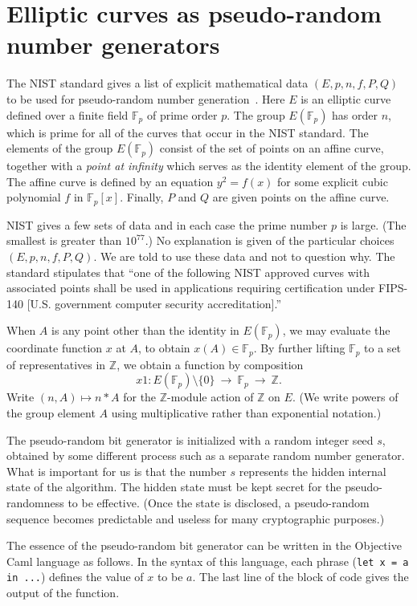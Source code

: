 \documentclass[11pt]{amsart} %
\newcommand{\ring}[1]{\mathbb{#1}}
\begin{document}
\section{Elliptic curves as pseudo-random number generators}

The NIST standard gives a list of explicit mathematical data $(E,p,n,f,P,Q)$ to be used for 
pseudo-random number generation~\cite{NIST}.
Here $E$ is an elliptic curve defined over a finite field $\ring{F}_p$ of prime order $p$.  
The group $E(\ring{F}_p)$ has order $n$, which is prime for all of the curves that occur in the NIST standard.
The elements of the group $E(\ring{F}_p)$ consist of the set of points on an affine curve, 
together with a {\it point at infinity} which
serves as the identity element of the group.
The affine curve is defined by an equation $y^2 = f(x)$
for some explicit cubic polynomial $f$ in $\ring{F}_p[x]$.
Finally, $P$ and $Q$ are given points on the affine curve. 

NIST gives a few sets of  data and in each case the  prime number $p$ is large. (The smallest is greater than $10^{77}$.)
No explanation is given of the particular choices $(E,p,n,f,P,Q)$.  We are told to
use these data and not to question why.
The standard stipulates that ``one of the following NIST approved curves with associated points 
shall be used in applications requiring certification under FIPS-140 [U.S. government computer security accreditation].'' 

When $A$ is any point other than the identity in $E(\ring{F}_p)$,
we may evaluate the coordinate function $x$ at $A$, to obtain $x(A)\in \ring{F}_p$.  By further lifting
$\ring{F}_p$ to a set of representatives in $\ring{Z}$, we obtain a function
by composition
\[
x1 : E(\ring{F}_p)\setminus\{0\}~ \to~ \ring{F}_p~\to~ \ring{Z}.
\]
Write  $(n,A)\mapsto n * A$
for the $\ring{Z}$-module action of $\ring{Z}$ on $E$.  (We write powers of the group element $A$ using
multiplicative rather than exponential notation.)


The pseudo-random bit generator is initialized with a random integer seed $s$, obtained
by some different process such as a separate  random number generator. 
What is important for us is that the number $s$ represents the hidden internal state of the
algorithm.  The hidden state must be kept secret for the pseudo-randomness to be effective.
(Once the state is disclosed, a pseudo-random sequence becomes predictable and useless for
many cryptographic purposes.)

The essence of the pseudo-random bit 
generator can be written in the Objective Caml language as follows.
In the syntax of this language, 
each phrase (\verb!let x = a in ...!) defines the value of $x$ to be $a$.
The last line of the block of code gives the output of the function.
\end{document}

